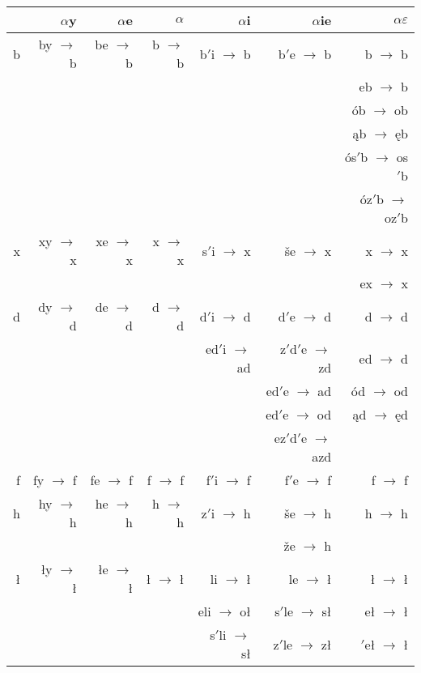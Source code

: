 \documentclass{article}
\begin{document}
\begin{longtable}{r|rrrrrr}
 & \boldmath$\alpha${\bf y} & \boldmath$\alpha${\bf e} & \boldmath$\alpha$ & \boldmath$\alpha${\bf i} & \boldmath$\alpha${\bf ie} & \boldmath$\alpha\varepsilon$\\
\hline
b & by $\rightarrow$ b & be $\rightarrow$ b & b $\rightarrow$ b & b$'$i $\rightarrow$ b & b$'$e $\rightarrow$ b & b $\rightarrow$ b\\
 &  &  &  &  &  & eb $\rightarrow$ b\\
 &  &  &  &  &  & ób $\rightarrow$ ob\\
 &  &  &  &  &  & ąb $\rightarrow$ ęb\\
 &  &  &  &  &  & ós$'$b $\rightarrow$ os$'$b\\
 &  &  &  &  &  & óz$'$b $\rightarrow$ oz$'$b\\
\hline
x & xy $\rightarrow$ x & xe $\rightarrow$ x & x $\rightarrow$ x & s$'$i $\rightarrow$ x & še $\rightarrow$ x & x $\rightarrow$ x\\
 &  &  &  &  &  & ex $\rightarrow$ x\\
\hline
d & dy $\rightarrow$ d & de $\rightarrow$ d & d $\rightarrow$ d & d$'$i $\rightarrow$ d & d$'$e $\rightarrow$ d & d $\rightarrow$ d\\
 &  &  &  & ed$'$i $\rightarrow$ ad & z$'$d$'$e $\rightarrow$ zd & ed $\rightarrow$ d\\
 &  &  &  &  & ed$'$e $\rightarrow$ ad & ód $\rightarrow$ od\\
 &  &  &  &  & ed$'$e $\rightarrow$ od & ąd $\rightarrow$ ęd\\
 &  &  &  &  & ez$'$d$'$e $\rightarrow$ azd & \\
\hline
f & fy $\rightarrow$ f & fe $\rightarrow$ f & f $\rightarrow$ f & f$'$i $\rightarrow$ f & f$'$e $\rightarrow$ f & f $\rightarrow$ f\\
\hline
h & hy $\rightarrow$ h & he $\rightarrow$ h & h $\rightarrow$ h & z$'$i $\rightarrow$ h & še $\rightarrow$ h & h $\rightarrow$ h\\
 &  &  &  &  & že $\rightarrow$ h & \\
\hline
ł & ły $\rightarrow$ ł & łe $\rightarrow$ ł & ł $\rightarrow$ ł & li $\rightarrow$ ł & le $\rightarrow$ ł & ł $\rightarrow$ ł\\
 &  &  &  & eli $\rightarrow$ oł & s$'$le $\rightarrow$ sł & eł $\rightarrow$ ł\\
 &  &  &  & s$'$li $\rightarrow$ sł & z$'$le $\rightarrow$ zł & $'$eł $\rightarrow$ ł\\

\end{longtable}
\end{document}
